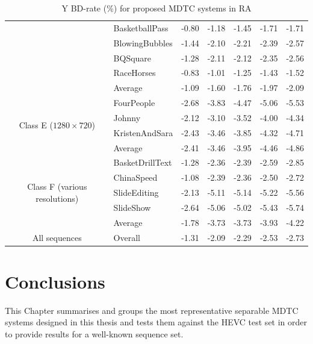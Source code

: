 \documentclass[11pt,a4paper,openright,twoside]{book}
\numberwithin{equation}{section} %
\numberwithin{figure}{section} %
\numberwithin{table}{section} %
\begin{document}
\begin{table}[tb]
\begin{tabularx}{\textwidth}{c|X|r|rrrr}
		& BasketballPass         & -0.80 & -1.18 & -1.45 & -1.71 & -1.71 \\
		& BlowingBubbles         & -1.44 & -2.10 & -2.21 & -2.39 & -2.57 \\
		& BQSquare               & -1.28 & -2.11 & -2.12 & -2.35 & -2.56 \\
		& RaceHorses             & -0.83 & -1.01 & -1.25 & -1.43 & -1.52 \\
		\cline{2-7} &
		Average                  & -1.09 & -1.60 & -1.76 & -1.97 & -2.09 \\
		\hline
		\hline
		\multirow{4}{2cm}{\centering Class E ($1280\times720$)}
		& FourPeople             & -2.68 & -3.83 & -4.47 & -5.06 & -5.53 \\
		& Johnny                 & -2.12 & -3.10 & -3.52 & -4.00 & -4.34 \\
		& KristenAndSara         & -2.43 & -3.46 & -3.85 & -4.32 & -4.71 \\
		\cline{2-7} &
		Average                  & -2.41 & -3.46 & -3.95 & -4.46 & -4.86 \\
		\hline
		\hline
		\multirow{5}{2cm}{\centering Class F (various resolutions)}
		& BasketDrillText        & -1.28 & -2.36 & -2.39 & -2.59 & -2.85 \\
		& ChinaSpeed             & -1.08 & -2.39 & -2.36 & -2.50 & -2.72 \\
		& SlideEditing           & -2.13 & -5.11 & -5.14 & -5.22 & -5.56 \\
		& SlideShow              & -2.64 & -5.06 & -5.02 & -5.43 & -5.74 \\
		\cline{2-7} &
		Average                  & -1.78 & -3.73 & -3.73 & -3.93 & -4.22 \\
		\hline
		\hline
		All sequences &
		Overall                  & -1.31 & -2.09 & -2.29 & -2.53 & -2.73 \\
	\end{tabularx}
	\caption{Y \acs{BD}-rate (\%) for proposed \acs{MDTC} systems in \acs{RA}}
	\label{tab:final_systems_ra}
\end{table}

\section{Conclusions}
\label{sec:summary_conclusions}

This Chapter summarises and groups the most representative separable \ac{MDTC}
systems designed in this thesis and tests them against the \ac{HEVC} test set
in order to provide results for a well-known sequence set.
\end{document}
